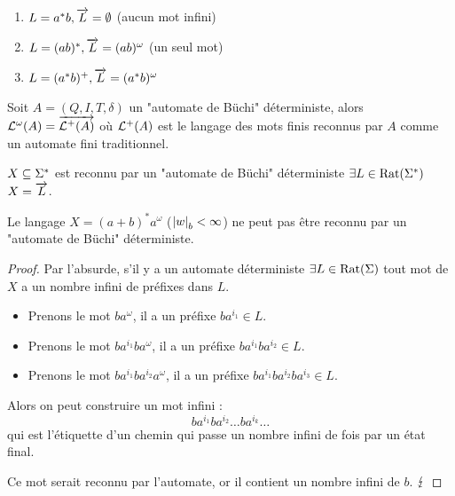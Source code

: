 \begin{exemple}
	$ $ \par\nobreak\ignorespaces
	\begin{enumerate}
		\item $L = a^*b, \overrightarrow{L} = \emptyset$ (aucun mot infini)
		\item $L = (ab)^*, \overrightarrow{L} = (ab)^{\omega}$ (un seul mot)
		\item $L = (a^*b)^+, \overrightarrow{L} =  (a^*b)^{\omega}$
	\end{enumerate}
\end{exemple}


\begin{prop}[Admis]
	Soit $A = (Q,I,T,\delta)$ un "automate de Büchi" déterministe, alors $\mathcal{L}^{\omega} (A) = \overrightarrow{\mathcal{L}^+ (A)}$
	où $\mathcal{L}^+ (A)$ est le langage des mots finis reconnus par $A$ comme un automate fini traditionnel.
\end{prop}


\begin{coro}
	$X \subseteq \Sigma^{*}$ est reconnu par un "automate de Büchi" déterministe \ssi $\exists L \in \text{Rat}(\Sigma^{*})$
	\tq $X = \overrightarrow{L}$.
\end{coro}

\begin{prop}
	Le langage $X = (a+b)^*a^{\omega}$ ($ {\left|w\right|}_b < \infty $) ne peut pas être reconnu par un "automate de Büchi" déterministe.
\end{prop}

\begin{proof}
	Par l'absurde, s'il y a un automate déterministe $\exists  L \in \text{Rat}(\Sigma)$ \tq tout mot de $X$ a un nombre infini de préfixes dans $L$.

	\begin{itemize}
		\item Prenons le mot $ba^{\omega}$, il a un préfixe $ba^{i_1} \in L$.
		\item Prenons le mot $ba^{i_1}ba^{\omega}$, il a un préfixe $ba^{i_1}ba^{i_2} \in L$.
		\item Prenons le mot $ba^{i_1}ba^{i_2}a^{\omega}$, il a un préfixe $ba^{i_1}ba^{i_2}ba^{i_3} \in L$.
	\end{itemize}

	Alors on peut construire un mot infini :
	$$ ba^{i_1}ba^{i_2}\ldots ba^{i_k}\ldots$$
	qui est l'étiquette d'un chemin qui passe un nombre infini de fois par un état final.

	Ce mot serait reconnu par l'automate, or il contient un nombre infini de $b$.  $\lightning$
\end{proof}


